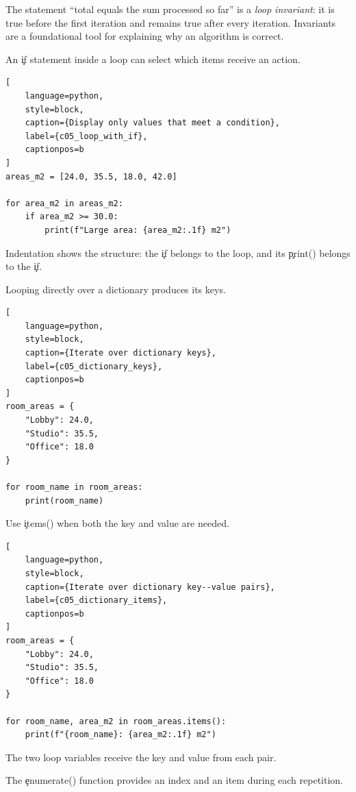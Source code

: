 The statement ``total equals the sum processed so far'' is a \emph{loop
invariant}: it is true before the first iteration and remains true after every
iteration. Invariants are a foundational tool for explaining why an algorithm
is correct.


An \c{if} statement inside a loop can select which items receive an action.

\begin{lstlisting}[
    language=python,
    style=block,
    caption={Display only values that meet a condition},
    label={c05_loop_with_if},
    captionpos=b
]
areas_m2 = [24.0, 35.5, 18.0, 42.0]

for area_m2 in areas_m2:
    if area_m2 >= 30.0:
        print(f"Large area: {area_m2:.1f} m2")
\end{lstlisting}

Indentation shows the structure: the \c{if} belongs to the loop, and its
\c{print()} belongs to the \c{if}.


Looping directly over a dictionary produces its keys.

\begin{lstlisting}[
    language=python,
    style=block,
    caption={Iterate over dictionary keys},
    label={c05_dictionary_keys},
    captionpos=b
]
room_areas = {
    "Lobby": 24.0,
    "Studio": 35.5,
    "Office": 18.0
}

for room_name in room_areas:
    print(room_name)
\end{lstlisting}

Use \c{items()} when both the key and value are needed.

\begin{lstlisting}[
    language=python,
    style=block,
    caption={Iterate over dictionary key--value pairs},
    label={c05_dictionary_items},
    captionpos=b
]
room_areas = {
    "Lobby": 24.0,
    "Studio": 35.5,
    "Office": 18.0
}

for room_name, area_m2 in room_areas.items():
    print(f"{room_name}: {area_m2:.1f} m2")
\end{lstlisting}

The two loop variables receive the key and value from each pair.


The \c{enumerate()} function provides an index and an item during each
repetition.

